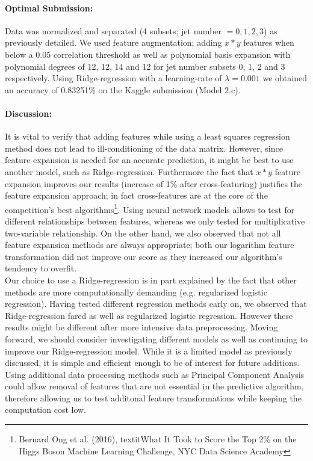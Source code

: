 \documentclass[10pt,a4paper]{article}
\begin{document}
\paragraph{Optimal Submission:}Data was normalized and separated (4 subsets; jet number $= 0, 1, 2, 3$) as previously detailed. We used feature augmentation; adding $x*y$ features when below a 0.05 correlation threshold as well as polynomial basis expansion with polynomial degrees of 12, 12, 14 and 12 for jet number subsets 0, 1, 2 and 3 respectively. Using Ridge-regression with a learning-rate of $\lambda = 0.001$ we obtained an accuracy of 0.83251\% on the Kaggle submission (Model 2.c).

\paragraph{Discussion:}It is vital to verify that adding features while using a least squares regression method does not lead to ill-conditioning of the data matrix. However, since feature expansion is needed for an accurate prediction, it might be best to use another model, such as Ridge-regression. Furthermore the fact that $x*y$ feature expansion improves our results (increase of 1\% after cross-featuring) justifies the feature expansion approach; in fact cross-features are at the core of the competition's best algorithms\footnote{Bernard Ong et al. (2016), textit{What It Took to Score the Top 2\% on the Higgs Boson Machine Learning Challenge}, NYC Data Science Academy}. Using neural network models allows to test for different relationships between features, whereas we only tested for multiplicative two-variable relationship. On the other hand, we also observed that not all feature expansion methods are always appropriate; both our logarithm feature transformation did not improve our score as they increased our algorithm's tendency to overfit.\\
\indent Our choice to use a Ridge-regression is in part explained by the fact that other methods are more computationally demanding (e.g. regularized logistic regression). Having tested different regression methods early on, we observed that Ridge-regression fared as well as regularized logistic regression. However these results might be different after more intensive data preprocessing. Moving forward, we should consider investigating different models as well as continuing to improve our Ridge-regression model. While it is a limited model as previously discussed, it is simple and efficient enough to be of interest for future additions. Using additional data processing methods such as Principal Component Analysis could allow removal of features that are not essential in the predictive algorithm, therefore allowing us to test additonal feature transformations while keeping the computation cost low.\\
\end{document}

